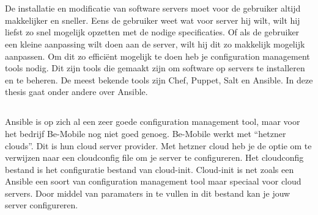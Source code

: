 
\chapter{}
\label{ch:inleiding}

De installatie en modificatie van software servers moet voor de gebruiker altijd makkelijker en sneller. Eens de gebruiker weet wat voor server hij wilt, wilt hij liefst zo snel mogelijk opzetten met de nodige specificaties. Of als de gebruiker een kleine aanpassing wilt doen aan de server, wilt hij dit zo makkelijk mogelijk aanpassen. Om dit zo efficiënt mogelijk te doen heb je configuration management tools nodig. Dit zijn tools die gemaakt zijn om software op servers te installeren en te beheren. De meest bekende tools zijn Chef, Puppet, Salt en Ansible. In deze thesis gaat onder andere over Ansible. 



\section{}
\label{sec:context}

Ansible is op zich al een zeer goede configuration management tool, maar voor het bedrijf Be-Mobile nog niet goed genoeg. Be-Mobile werkt met “hetzner clouds”. Dit is hun cloud server provider. Met hetzner cloud heb je de optie om te verwijzen naar een cloudconfig file om je server te configureren. Het cloudconfig bestand is het configuratie  bestand van cloud-init. Cloud-init is net zoals een Ansible een soort van configuration management tool maar speciaal voor cloud servers. Door middel van paramaters in te vullen in dit bestand kan je jouw server configureren. 


